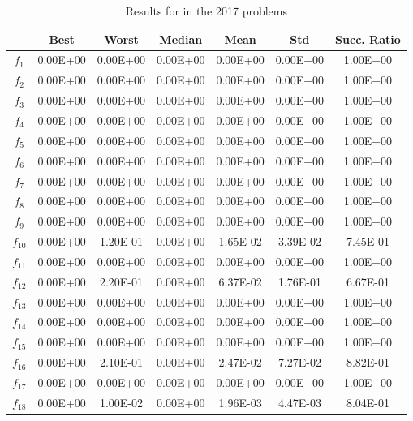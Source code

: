 \begin{table}[t]
\begin{scriptsize}
\centering
\caption{Results for \DEEDM{} in the \CEC{} 2017 problems}
\label{tab:Results_CEC2017}
\begin{tabular}{|c|c|c|c|c|c|c|}
\hline
 & \textbf{Best} & \textbf{Worst} & \textbf{Median} & \textbf{Mean} & \textbf{Std} & \textbf{Succ. Ratio} \\ \hline
$f_1$ & 0.00E+00 & 0.00E+00 & 0.00E+00 & 0.00E+00 & 0.00E+00 & 1.00E+00 \\ \hline
$f_2$ & 0.00E+00 & 0.00E+00 & 0.00E+00 & 0.00E+00 & 0.00E+00 & 1.00E+00 \\ \hline
$f_3$ & 0.00E+00 & 0.00E+00 & 0.00E+00 & 0.00E+00 & 0.00E+00 & 1.00E+00 \\ \hline
$f_4$ & 0.00E+00 & 0.00E+00 & 0.00E+00 & 0.00E+00 & 0.00E+00 & 1.00E+00 \\ \hline
$f_5$ & 0.00E+00 & 0.00E+00 & 0.00E+00 & 0.00E+00 & 0.00E+00 & 1.00E+00 \\ \hline
$f_6$ & 0.00E+00 & 0.00E+00 & 0.00E+00 & 0.00E+00 & 0.00E+00 & 1.00E+00 \\ \hline
$f_7$ & 0.00E+00 & 0.00E+00 & 0.00E+00 & 0.00E+00 & 0.00E+00 & 1.00E+00 \\ \hline
$f_8$ & 0.00E+00 & 0.00E+00 & 0.00E+00 & 0.00E+00 & 0.00E+00 & 1.00E+00 \\ \hline
$f_9$ & 0.00E+00 & 0.00E+00 & 0.00E+00 & 0.00E+00 & 0.00E+00 & 1.00E+00 \\ \hline
$f_{10}$ & 0.00E+00 & 1.20E-01 & 0.00E+00 & 1.65E-02 & 3.39E-02 & 7.45E-01 \\ \hline
$f_{11}$ & 0.00E+00 & 0.00E+00 & 0.00E+00 & 0.00E+00 & 0.00E+00 & 1.00E+00 \\ \hline
$f_{12}$ & 0.00E+00 & 2.20E-01 & 0.00E+00 & 6.37E-02 & 1.76E-01 & 6.67E-01 \\ \hline
$f_{13}$ & 0.00E+00 & 0.00E+00 & 0.00E+00 & 0.00E+00 & 0.00E+00 & 1.00E+00 \\ \hline
$f_{14}$ & 0.00E+00 & 0.00E+00 & 0.00E+00 & 0.00E+00 & 0.00E+00 & 1.00E+00 \\ \hline
$f_{15}$ & 0.00E+00 & 0.00E+00 & 0.00E+00 & 0.00E+00 & 0.00E+00 & 1.00E+00 \\ \hline
$f_{16}$ & 0.00E+00 & 2.10E-01 & 0.00E+00 & 2.47E-02 & 7.27E-02 & 8.82E-01 \\ \hline
$f_{17}$ & 0.00E+00 & 0.00E+00 & 0.00E+00 & 0.00E+00 & 0.00E+00 & 1.00E+00 \\ \hline
$f_{18}$ & 0.00E+00 & 1.00E-02 & 0.00E+00 & 1.96E-03 & 4.47E-03 & 8.04E-01 \\ \hline

\end{tabular}
\end{scriptsize}
\end{table}
